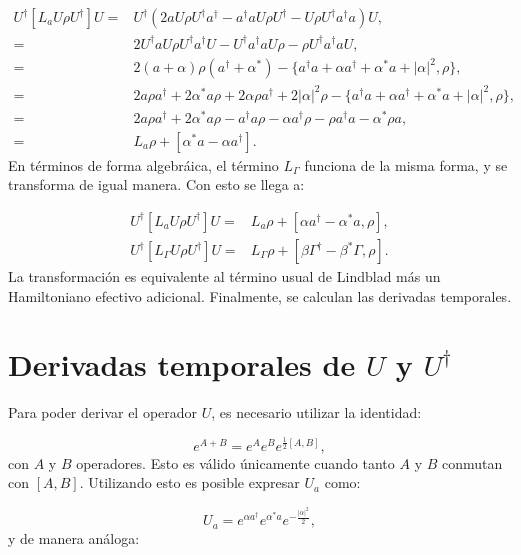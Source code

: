 \documentclass[a4paper,10pt]{report}
\begin{document}
\begin{align*}
U^\dagger [L_aU\rho U^\dagger]U =& U^\dagger(2aU\rho U^\dagger a^\dagger - a^\dagger a U\rho U^\dagger - U\rho U^\dagger a^\dagger a)U,\\
=& 2U^\dagger a U \rho U^\dagger a^\dagger U - U^\dagger a^\dagger a U \rho -\rho U^\dagger a^\dagger a U, \\
=& 2(a+\alpha)\rho(a^\dagger+\alpha^*)-\{a^\dagger a +\alpha a^\dagger + \alpha^* a + |\alpha|^2,\rho \},\\
=& 2a\rho a^\dagger + 2\alpha^* a\rho +2\alpha \rho a^\dagger + 2|\alpha|^2\rho -\{a^\dagger a +\alpha a^\dagger + \alpha^* a + |\alpha|^2,\rho \},\\
=& 2a\rho a^\dagger + 2\alpha^* a\rho - a^\dagger a \rho -\alpha a^\dagger \rho -\rho a^\dagger a -\alpha^* \rho a,\\
=& L_a\rho + [\alpha^* a - \alpha a^\dagger].
\end{align*} En términos de forma algebráica, el término $L_\Gamma$ funciona de la misma forma, y se transforma de igual manera. Con esto se llega a:

\begin{align}
U^\dagger [L_aU\rho U^\dagger]U=& L_a\rho + [\alpha a^\dagger - \alpha^* a,\rho],\\
U^\dagger [L_\Gamma U\rho U^\dagger]U =& L_\Gamma \rho + [ \beta \Gamma^\dagger - \beta^* \Gamma,\rho].
\end{align} La transformación es equivalente al término usual de Lindblad más un Hamiltoniano efectivo adicional. Finalmente, se calculan las derivadas temporales.

\section{Derivadas temporales de $U$ y $U^\dagger$}

Para poder derivar el operador $U$, es necesario utilizar la identidad:

\begin{equation}
e^{A+B} = e^A e^B e^{\frac{1}{2}[A,B]},
\end{equation} con $A$ y $B$ operadores. Esto es válido únicamente cuando tanto $A$ y $B$ conmutan con $[A,B]$. Utilizando esto es posible expresar $U_a$ como:

\begin{equation}
U_a = e^{\alpha a^\dagger}e^{\alpha^* a}e^{-\frac{|\alpha|^2}{2}},
\end{equation} y de manera análoga:
\end{document}
